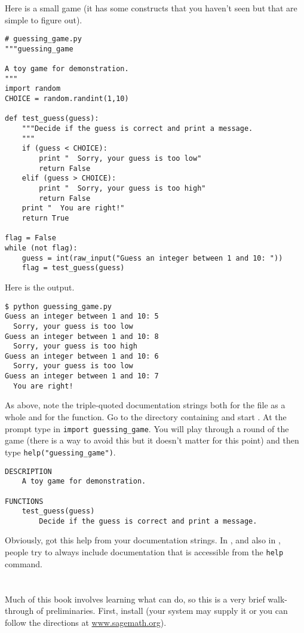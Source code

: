 Here is a small game (it has some \python{} constructs that
you haven't seen but that are simple to figure out).
\begin{lstlisting}[style=python]
# guessing_game.py
"""guessing_game

A toy game for demonstration.
"""
import random
CHOICE = random.randint(1,10)

def test_guess(guess):
    """Decide if the guess is correct and print a message.
    """
    if (guess < CHOICE):
        print "  Sorry, your guess is too low"
        return False
    elif (guess > CHOICE):
        print "  Sorry, your guess is too high"
        return False
    print "  You are right!"
    return True

flag = False
while (not flag):
    guess = int(raw_input("Guess an integer between 1 and 10: "))
    flag = test_guess(guess)
\end{lstlisting}
Here is the output.
\begin{lstlisting}
$ python guessing_game.py
Guess an integer between 1 and 10: 5
  Sorry, your guess is too low
Guess an integer between 1 and 10: 8
  Sorry, your guess is too high
Guess an integer between 1 and 10: 6
  Sorry, your guess is too low
Guess an integer between 1 and 10: 7
  You are right!
\end{lstlisting}  %

As above, note the triple-quoted documentation strings both for the 
file as a whole and for the function.
Go to the directory containing  and start \python{}.
At the prompt type in \lstinline[style=inline]!import guessing_game!.
You will play through a round of the game (there is a way to avoid this
but it doesn't matter for this point) and then type
\lstinline[style=inline]!help("guessing_game")!.
\begin{lstlisting}
DESCRIPTION
    A toy game for demonstration.

FUNCTIONS
    test_guess(guess)
        Decide if the guess is correct and print a message. 
\end{lstlisting}
Obviously, \python{} got this help from your documentation strings.
In \python{}, and also in \Sage, people try to always include documentation
that is accessible from the \lstinline[style=inline]!help! command.




\section{\Sage}
Much of this book involves learning what \Sage{} can do, so this is a very
brief walk-through of preliminaries.
First, install \Sage{} (your system may supply it or you can
follow the directions at
\href{http://www.sagemath.org}{www.sagemath.org}).

